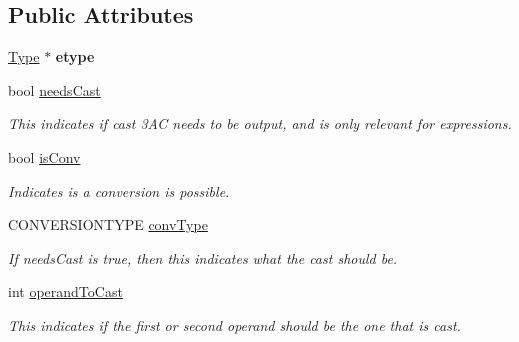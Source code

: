 \subsection*{Public Attributes}
\begin{DoxyCompactItemize}
\item 
\hypertarget{classAstPrimaryExpr_a872f9d089ce72fa3679bca3b40e1ba77}{\hyperlink{classType}{Type} $\ast$ {\bfseries etype}}\label{classAstPrimaryExpr_a872f9d089ce72fa3679bca3b40e1ba77}

\item 
\hypertarget{classAST_aaf215802de409f8096c063d01ffa6783}{bool \hyperlink{classAST_aaf215802de409f8096c063d01ffa6783}{needs\-Cast}}\label{classAST_aaf215802de409f8096c063d01ffa6783}

\begin{DoxyCompactList}\small\item\em This indicates if cast 3\-A\-C needs to be output, and is only relevant for expressions. \end{DoxyCompactList}\item 
\hypertarget{classAST_afa9e77ef650ec6664458fa6cb55be985}{bool \hyperlink{classAST_afa9e77ef650ec6664458fa6cb55be985}{is\-Conv}}\label{classAST_afa9e77ef650ec6664458fa6cb55be985}

\begin{DoxyCompactList}\small\item\em Indicates is a conversion is possible. \end{DoxyCompactList}\item 
\hypertarget{classAST_a61ef3317e023d45237e06615b387cd6b}{C\-O\-N\-V\-E\-R\-S\-I\-O\-N\-T\-Y\-P\-E \hyperlink{classAST_a61ef3317e023d45237e06615b387cd6b}{conv\-Type}}\label{classAST_a61ef3317e023d45237e06615b387cd6b}

\begin{DoxyCompactList}\small\item\em If needs\-Cast is true, then this indicates what the cast should be. \end{DoxyCompactList}\item 
\hypertarget{classAST_aea9b07b39d24183f38c0029cec0a878e}{int \hyperlink{classAST_aea9b07b39d24183f38c0029cec0a878e}{operand\-To\-Cast}}\label{classAST_aea9b07b39d24183f38c0029cec0a878e}

\begin{DoxyCompactList}\small\item\em This indicates if the first or second operand should be the one that is cast. \end{DoxyCompactList}\end{DoxyCompactItemize}
